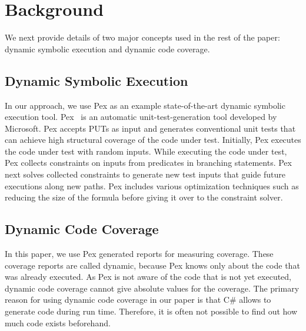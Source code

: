 \section{Background}
\label{sec:background}

We next provide details of two major concepts used in the rest of
the paper: dynamic symbolic execution and dynamic code coverage.

\subsection{Dynamic Symbolic Execution}

In our approach, we use Pex as an example state-of-the-art dynamic symbolic 
execution tool. Pex~\cite{tillman:pexwhite} is an automatic unit-test-generation 
tool developed by Microsoft. Pex accepts PUTs as input and generates conventional 
unit tests that can achieve high 
structural coverage of the code under test. Initially, Pex
executes the code under test with random inputs. While executing
the code under test, Pex collects constraints on inputs from predicates
in branching statements. Pex next solves collected constraints
to generate new test inputs that guide future executions along
new paths. Pex includes various optimization techniques such as
reducing the size of the formula before giving it over to the constraint solver.

\subsection{Dynamic Code Coverage}
\label{sec:blockcov}

In this paper, we use Pex generated reports for measuring coverage. These coverage
reports are called dynamic, because Pex knows only about the code that was already executed.
As Pex is not aware of the code that is not yet executed, dynamic code coverage
cannot give absolute values for the coverage. The primary reason for using
dynamic code coverage in our paper is that C\# allows to generate code during run time.
Therefore, it is often not possible to find out how much code exists beforehand.